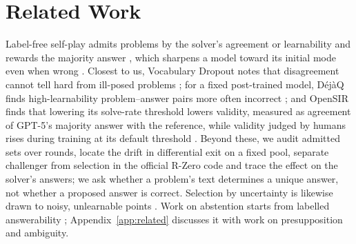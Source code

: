 \section{Related Work}
\label{sec:related}

Label-free self-play admits problems by the solver's agreement or learnability \citep{huang2026rzero,zhao2025absolute,fang2025serl,chen2025sqlm} and rewards the majority answer \citep{zuo2025ttrl}, which sharpens a model toward its initial mode even when wrong \citep{huang2025sharpening,shafayat2025srt}. Closest to us, Vocabulary Dropout notes that disagreement cannot tell hard from ill-posed problems \citep{dineen2026vocabulary}; for a fixed post-trained model, D\'ej\`aQ finds high-learnability problem--answer pairs more often incorrect \citep{ropke2026dejaq}; and OpenSIR finds that lowering its solve-rate threshold lowers validity, measured as agreement of GPT-5's majority answer with the reference, while validity judged by humans rises during training at its default threshold \citep{kwan2025opensir}. Beyond these, we audit admitted sets over rounds, locate the drift in differential exit on a fixed pool, separate challenger from selection in the official R-Zero code and trace the effect on the solver's answers; we ask whether a problem's text determines a unique answer, not whether a proposed answer is correct. Selection by uncertainty is likewise drawn to noisy, unlearnable points \citep{mindermann2022rholoss}. Work on abstention starts from labelled answerability \citep{song2025hallucination,kirichenko2025abstentionbench}; Appendix~\ref{app:related} discusses it with work on presupposition and ambiguity.
